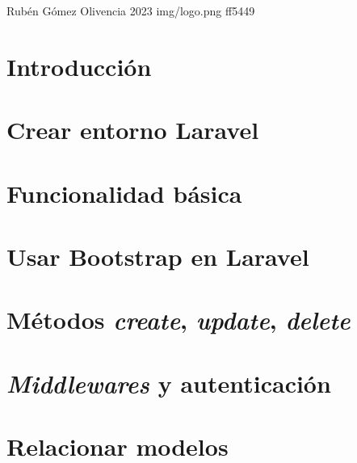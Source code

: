 \documentclass{\ClassPath/yukibook}
\begin{document}
    {Rubén Gómez Olivencia}  %
    {2023}    %
    {} %
    {} %
    {} %
    {img/logo.png} %
    {ff5449}
    {} %

    \coverpage
    \graphicspath{{../../yukibook.cls/}}
    \licensepage
    \tableofcontents

    \graphicspath{{img/}}

    \part{Introducción}
    
    

    \part{Crear entorno Laravel}
    
    

    \part{Funcionalidad básica}
    

    \part{Usar Bootstrap en Laravel}
    

    \part{Métodos \textit{create}, \textit{update}, \textit{delete}}
    

    \part{\textit{Middlewares} y autenticación}
    

    \part{Relacionar modelos}
    
\end{document}

